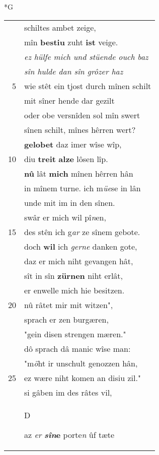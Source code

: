 \documentclass[8pt,a4paper,notitlepage]{article}
\begin{document}
\begin{table}[ht]
\begin{minipage}[t]{0.5\linewidth}
\small
\begin{center}*G
\end{center}
\begin{tabular}{rl}
 & schiltes ambet zeige,\\ 
 & mîn \textbf{bestiu} zuht \textbf{ist} veige.\\ 
 & \textit{ez hülfe mich und stüende ouch baz}\\ 
 & \textit{sîn hulde dan sîn grôzer haz}\\ 
5 & wie stêt ein tjost durch mînen schilt\\ 
 & mit sîner hende dar gezilt\\ 
 & oder obe versnîden sol mîn swert\\ 
 & sînen schilt, mînes hêrren wert?\\ 
 & \textbf{gelobet} daz imer wîse wîp,\\ 
10 & diu \textbf{treit} \textbf{alze} lôsen lîp.\\ 
 & \textbf{nû} lât \textbf{mich} mînen hêrren hân\\ 
 & in mînem turne. ich m\textit{üe}se in lân\\ 
 & unde mit im in den sînen.\\ 
 & swâr er mich wil pî\textit{n}en,\\ 
15 & des stên ich g\textit{ar} ze sînem gebote.\\ 
 & doch \textbf{wil} ich \textit{gerne} danken gote,\\ 
 & daz er mich niht gevangen hât,\\ 
 & sît in sîn \textbf{zürnen} niht erlât,\\ 
 & er enwelle mich hie besitzen.\\ 
20 & nû râtet mir mit witzen",\\ 
 & sprach er zen burgæren,\\ 
 & "gein disen strengen mæren."\\ 
 & dô sprach dâ manic wîse man:\\ 
 & "m\textit{ö}ht ir unschult genozzen hân,\\ 
25 & ez wære niht komen an disiu zil."\\ 
 & si gâben im des râtes vil,\\ 
 & \begin{large}D\end{large}az \textit{er} \textbf{\textit{sîn}e} porte\textit{n} ûf tæte\\ 

\end{tabular}
\end{minipage}
\end{table}
\end{document}
